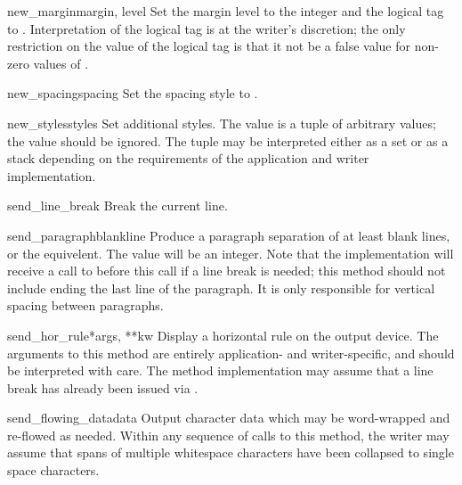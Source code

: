 \begin{methoddesc}[writer]{new_margin}{margin, level}
Set the margin level to the integer  and the logical tag
to .  Interpretation of the logical tag is at the
writer's discretion; the only restriction on the value of the logical
tag is that it not be a false value for non-zero values of
.
\end{methoddesc}

\begin{methoddesc}[writer]{new_spacing}{spacing}
Set the spacing style to .
\end{methoddesc}

\begin{methoddesc}[writer]{new_styles}{styles}
Set additional styles.  The  value is a tuple of
arbitrary values; the value  should be ignored.  The
 tuple may be interpreted either as a set or as a stack
depending on the requirements of the application and writer
implementation.
\end{methoddesc}

\begin{methoddesc}[writer]{send_line_break}{}
Break the current line.
\end{methoddesc}

\begin{methoddesc}[writer]{send_paragraph}{blankline}
Produce a paragraph separation of at least  blank
lines, or the equivelent.  The  value will be an
integer.  Note that the implementation will receive a call to
 before this call if a line break is needed; 
this method should not include ending the last line of the paragraph.
It is only responsible for vertical spacing between paragraphs.
\end{methoddesc}

\begin{methoddesc}[writer]{send_hor_rule}{*args, **kw}
Display a horizontal rule on the output device.  The arguments to this
method are entirely application- and writer-specific, and should be
interpreted with care.  The method implementation may assume that a
line break has already been issued via .
\end{methoddesc}

\begin{methoddesc}[writer]{send_flowing_data}{data}
Output character data which may be word-wrapped and re-flowed as
needed.  Within any sequence of calls to this method, the writer may
assume that spans of multiple whitespace characters have been
collapsed to single space characters.
\end{methoddesc}

